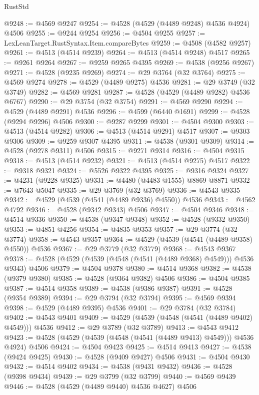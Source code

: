 \begin{lexlean}{RustStd}
\begin{coremodule}
@9248 := @4569 @9247
@9254 := @4528 (@4529 (@4489 @9248) @4536 @4924) @4506
@9255 := @9244 @9254
@9256 := @4504 @9255
@9257 := LexLeanTarget.RustSyntax.Item.compareBytes
@9259 := @4508 (@4582 @9257)
@9261 := @4513 (@4514 @9239)
@9264 := @4513 (@4514 @9248) @4517
@9265 := @9261 @9264
@9267 := @9259 @9265 @4395
@9269 := @4538 (@9256 @9267)
@9271 := @4528 (@9235 @9269)
@9274 := @29 @3764 (@32 @3764)
@9275 := @4569 @9274
@9278 := @4529 (@4489 @9275) @4536
@9281 := @29 @3749 (@32 @3749)
@9282 := @4569 @9281
@9287 := @4528 (@4529 (@4489 @9282) @4536 @6767)
@9290 := @29 @3754 (@32 @3754)
@9291 := @4569 @9290
@9294 := @4529 (@4489 @9291) @4536
@9296 := @4599 (@6440 @1691)
@9299 := @4528 (@9294 @9296) @4506
@9300 := @9287 @9299
@9301 := @4504 @9300
@9303 := @4513 (@4514 @9282)
@9306 := @4513 (@4514 @9291) @4517
@9307 := @9303 @9306
@9309 := @9259 @9307 @4395
@9311 := @4538 (@9301 @9309)
@9314 := @4528 (@9278 @9311) @4506
@9315 := @9271 @9314
@9316 := @4504 @9315
@9318 := @4513 (@4514 @9232)
@9321 := @4513 (@4514 @9275) @4517
@9322 := @9318 @9321
@9324 := @5526 @9322 @4395
@9325 := @9316 @9324
@9327 := @4231 (@9228 @9325)
@9331 := @4480 (@4483 @1555) @8869 @8871
@9332 := @7643 @5047
@9335 := @29 @3769 (@32 @3769)
@9336 := @4543 @9335
@9342 := @4529 (@4539 (@4541 (@4489 @9336) @4550)) @4536
@9343 := @4562 @4792
@9346 := @4528 (@9342 @9343) @4506
@9347 := @4504 @9346
@9348 := @4514 @9336
@9350 := @4538 (@9347 @9348)
@9352 := @4528 (@9332 @9350)
@9353 := @4851 @4256
@9354 := @4835 @9353
@9357 := @29 @3774 (@32 @3774)
@9358 := @4543 @9357
@9364 := @4529 (@4539 (@4541 (@4489 @9358) @4550)) @4536
@9367 := @29 @3779 (@32 @3779)
@9368 := @4543 @9367
@9378 := @4528 (@4529 (@4539 (@4548 (@4541 (@4489 @9368) @4549))) @4536 @9343) @4506
@9379 := @4504 @9378
@9380 := @4514 @9368
@9382 := @4538 (@9379 @9380)
@9385 := @4528 (@9364 @9382) @4506
@9386 := @4504 @9385
@9387 := @4514 @9358
@9389 := @4538 (@9386 @9387)
@9391 := @4528 (@9354 @9389)
@9394 := @29 @3794 (@32 @3794)
@9395 := @4569 @9394
@9398 := @4529 (@4489 @9395) @4536
@9401 := @29 @3784 (@32 @3784)
@9402 := @4543 @9401
@9409 := @4529 (@4539 (@4548 (@4541 (@4489 @9402) @4549))) @4536
@9412 := @29 @3789 (@32 @3789)
@9413 := @4543 @9412
@9423 := @4528 (@4529 (@4539 (@4548 (@4541 (@4489 @9413) @4549))) @4536 @4924) @4506
@9424 := @4504 @9423
@9425 := @4514 @9413
@9427 := @4538 (@9424 @9425)
@9430 := @4528 (@9409 @9427) @4506
@9431 := @4504 @9430
@9432 := @4514 @9402
@9434 := @4538 (@9431 @9432)
@9436 := @4528 (@9398 @9434)
@9439 := @29 @3799 (@32 @3799)
@9440 := @4569 @9439
@9446 := @4528 (@4529 (@4489 @9440) @4536 @4627) @4506

\end{coremodule}
\end{lexlean}
